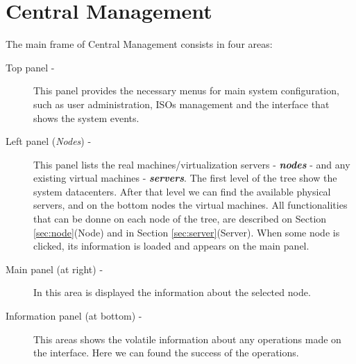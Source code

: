 
\chapter{\textsf{Central Management}}

The main frame of Central Management consists in four areas:

\begin{description}
	\item[Top panel -] This panel provides the necessary menus for main system configuration, such as user administration, ISOs management and the interface that shows the system events.
	\item[Left panel (\emph{Nodes}) -] This panel lists the real machines/virtualization servers - {\bf\emph{nodes}} - and any existing virtual machines - {\bf\emph{servers}}. The first level of the tree show the system datacenters. After that level we can find the available physical servers, and on the bottom nodes the virtual machines. All functionalities that can be donne on each node of the tree, are described on Section \ref{sec:node}(Node) and in Section \ref{sec:server}(Server). When some node is clicked, its information is loaded and appears on the main panel.
	\item[Main panel (at right) -] In this area is displayed the information about the selected node.
	\item[Information panel (at bottom) -] This areas shows the volatile information about any operations made on the interface. Here we can found the success of the operations.
\end{description}

